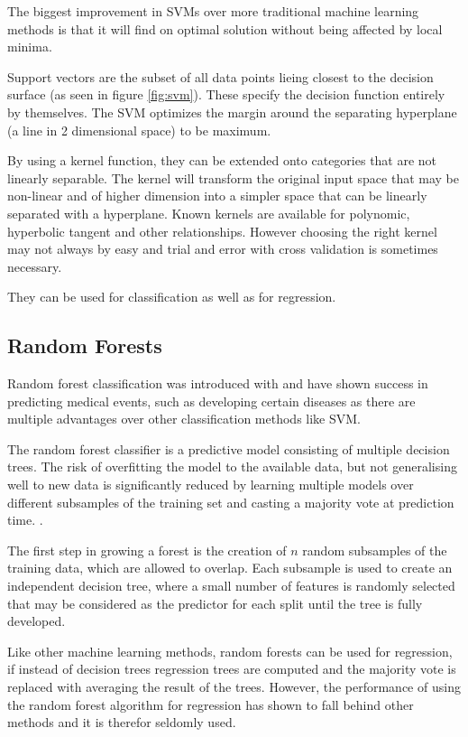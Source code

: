 The biggest improvement in SVMs over more traditional machine learning methods is that it will find on optimal solution without being affected by local minima.

Support vectors are the subset of all data points lieing closest to the decision surface (as seen in figure \ref{fig:svm}). These specify the decision function entirely by themselves. The SVM optimizes the margin around the separating hyperplane (a line in 2 dimensional space) to be maximum.

By using a kernel function, they can be extended onto categories that are not linearly separable. The kernel will transform the original input space that may be non-linear and of higher dimension into a simpler space that can be linearly separated with a hyperplane. Known kernels are available for polynomic, hyperbolic tangent and other relationships. However choosing the right kernel may not always by easy and trial and error with cross validation is sometimes necessary.

They can be used for classification as well as for regression.





\subsection{Random Forests}


Random forest classification was introduced with \cite{Breiman2001} and have shown success in predicting medical events, such as developing certain diseases as there are multiple advantages over other classification methods like SVM.

The random forest classifier is a predictive model consisting of multiple decision trees. The risk of overfitting the model to the available data, but not generalising well to new data is significantly reduced by learning multiple models over different subsamples of the training set and casting a majority vote at prediction time. \cite{statisticallearning}.

The first step in growing a forest is the creation of $n$ random subsamples of the training data, which are allowed to overlap. Each subsample is used to create an independent decision tree, where a small number of features is randomly selected that may be considered as the predictor for each split until the tree is fully developed.

Like other machine learning methods, random forests can be used for regression, if instead of decision trees regression trees are computed and the majority vote is replaced with averaging the result of the trees. However, the performance of using the random forest algorithm for regression has shown to fall behind other methods and it is therefor seldomly used.

